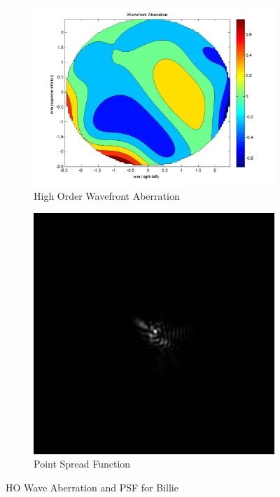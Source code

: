 \documentclass{article}
\begin{document}
\begin{figure}[H]
\begin{subfigure}{.5\textwidth}
  \centering
  \includegraphics[width=1\linewidth]{Billie_WFA.png}
  \caption{High Order Wavefront Aberration}
  \label{fig:billiehowa}
\end{subfigure}%
\begin{subfigure}{.5\textwidth}
  \centering
  \includegraphics[width=.8\linewidth]{Billie_PSF.png}
  \caption{Point Spread Function}
  \label{fig:billiepsf}
\end{subfigure}
\caption{HO Wave Aberration and PSF for Billie}
\label{fig:billie}
\end{figure}
\end{document}
